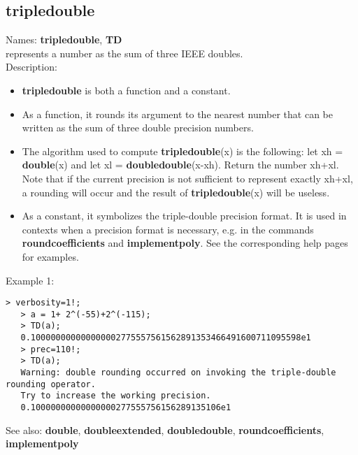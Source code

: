 \subsection{ tripledouble }
\noindent Names: \textbf{tripledouble}, \textbf{TD}\\
represents a number as the sum of three IEEE doubles.\\

\noindent Description: \begin{itemize}

\item \textbf{tripledouble} is both a function and a constant.

\item As a function, it rounds its argument to the nearest number that can be written
   as the sum of three double precision numbers.

\item The algorithm used to compute \textbf{tripledouble}(x) is the following: let xh = \textbf{double}(x)
   and let xl = \textbf{doubledouble}(x-xh). Return the number xh+xl. Note that if the
   current precision is not sufficient to represent exactly xh+xl, a rounding will
   occur and the result of \textbf{tripledouble}(x) will be useless.

\item As a constant, it symbolizes the triple-double precision format. It is used in 
   contexts when a precision format is necessary, e.g. in the commands 
   \textbf{roundcoefficients} and \textbf{implementpoly}.
   See the corresponding help pages for examples.
\end{itemize}
\noindent Example 1: 
\begin{center}\begin{minipage}{14.8cm}\begin{Verbatim}[frame=single]
   > verbosity=1!;
   > a = 1+ 2^(-55)+2^(-115);
   > TD(a);
   0.100000000000000002775557561562891353466491600711095598e1
   > prec=110!;
   > TD(a);
   Warning: double rounding occurred on invoking the triple-double rounding operator.
   Try to increase the working precision.
   0.10000000000000000277555756156289135106e1
\end{Verbatim}
\end{minipage}\end{center}
See also: \textbf{double}, \textbf{doubleextended}, \textbf{doubledouble}, \textbf{roundcoefficients}, \textbf{implementpoly}
